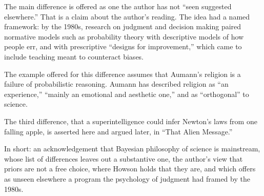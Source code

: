 \begin{afterword}
The main difference is offered as one the author has not ``seen suggested elsewhere.'' That is a claim about the author's reading. The idea had a named framework: by the 1980s, research on judgment and decision making paired normative models such as probability theory with descriptive models of how people err, and with prescriptive ``designs for improvement,'' which came to include teaching meant to counteract biases.

The example offered for this difference assumes that Aumann's religion is a failure of probabilistic reasoning. Aumann has described religion as ``an experience,'' ``mainly an emotional and aesthetic one,'' and as ``orthogonal'' to science.

The third difference, that a superintelligence could infer Newton's laws from one falling apple, is asserted here and argued later, in ``That Alien Message.''

In short: an acknowledgement that Bayesian philosophy of science is mainstream, whose list of differences leaves out a substantive one, the author's view that priors are not a free choice, where Howson holds that they are, and which offers as unseen elsewhere a program the psychology of judgment had framed by the 1980s.
\end{afterword}
